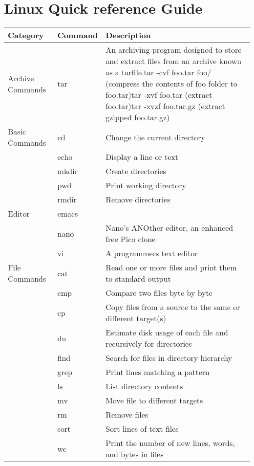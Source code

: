 \section{Linux Quick reference Guide}

\begin{tabular}{|p{0.6in}|p{0.7in}|p{2.9in}|} \hline
\textbf{Category} & \textbf{Command} & \textbf{Description} \\ \hline
Archive Commands & tar & An archiving program designed to store and extract files from an archive known as a tarfile.\newline tar  -cvf foo.tar   foo/ (compress the contents of foo folder to foo.tar)\newline tar  -xvf  foo.tar (extract foo.tar)\newline tar -xvzf  foo.tar.gz (extract gzipped foo.tar.gz) \\ \hline
Basic Commands & cd & Change the current directory \\ \hline
& echo & Display a line or text \\ \hline
& mkdir & Create directories \\ \hline
& pwd & Print working directory \\ \hline
& rmdir & Remove directories \\ \hline
Editor & emacs &  \\ \hline
& nano & Nano's ANOther editor, an enhanced free Pico clone \\ \hline
& vi & A programmers text editor \\ \hline
File Commands & cat & Read one or more files and print them to standard output \\ \hline
& cmp & Compare two files byte by byte \\ \hline
& cp & Copy files from a source to the same or different target(s) \\ \hline
& du & Estimate disk usage of each file and recursively for directories \\ \hline
& find & Search for files in directory hierarchy \\ \hline
& grep & Print lines matching a pattern \\ \hline
& ls & List directory contents \\ \hline
& mv & Move file to different targets \\ \hline
& rm & Remove files \\ \hline
& sort & Sort lines of text files \\ \hline
& wc & Print the number of new lines, words, and bytes in files \\ \hline

\end{tabular}

